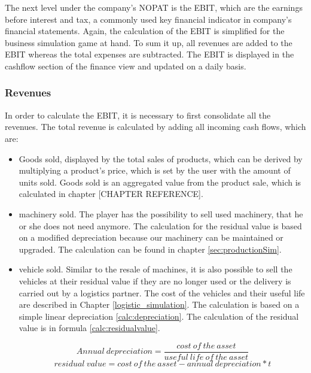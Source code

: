 The next level under the company's NOPAT is the EBIT, which are the earnings before interest and tax, a commonly used key financial indicator in company's financial statements. \cite{lee_e_2006} Again, the calculation of the EBIT is simplified for the business simulation game at hand. To sum it up, all revenues are added to the EBIT whereas the total expenses are subtracted. The EBIT is displayed in the cashflow section of the finance view and updated on a daily basis.

\subsubsection{Revenues}
In order to calculate the EBIT, it is necessary to first consolidate all the revenues. The total revenue is calculated by adding all incoming cash flows, which are:
\begin{itemize}
    \item Goods sold, displayed by the total sales of products, which can be derived by multiplying a product’s price, which is set by the user with the amount of units sold. 
    Goods sold is an aggregated value from the product sale, which is calculated in chapter [CHAPTER REFERENCE].
    \item machinery sold. The player has the possibility to sell used machinery, that he or she does not need anymore. The calculation for the residual value is based on a modified depreciation because our machinery can be maintained or upgraded. The calculation can be found in chapter \ref{sec:productionSim}.
    \item vehicle sold. Similar to the resale of machines, it is also possible to sell the vehicles at their residual value if they are no longer used or the delivery is carried out by a logistics partner. The cost of the vehicles and their useful life are described in Chapter \ref{logistic_simulation}. The calculation is based on a simple linear depreciation \ref{calc:depreciation}. The calculation of the residual value is in formula \ref{calc:residualvalue}.
    
     \begin{equation}
     \label{calc:depreciation}
     Annual \ depreciation = {\dfrac{cost \ of \ the \ asset}{useful \ life \ of \ the \ asset}}
    \end{equation}
     \begin{equation}
     \label{calc:residualvalue}
     residual \ value = {{cost \ of \ the \ asset} - {annual \ depreciation * t }}    
     \end{equation}
     

\end{itemize}
